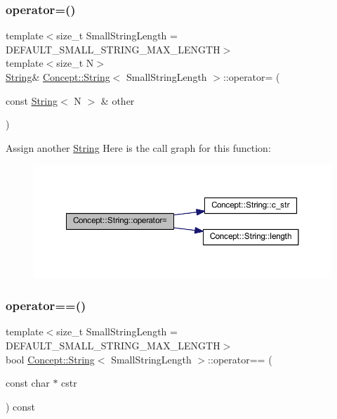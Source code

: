 \subsubsection{\texorpdfstring{operator=()}{operator=()}\hspace{0.1cm}{\footnotesize\ttfamily [3/3]}}
{\footnotesize\ttfamily template$<$size\+\_\+t Small\+String\+Length = D\+E\+F\+A\+U\+L\+T\+\_\+\+S\+M\+A\+L\+L\+\_\+\+S\+T\+R\+I\+N\+G\+\_\+\+M\+A\+X\+\_\+\+L\+E\+N\+G\+TH$>$ \\
template$<$size\+\_\+t N$>$ \\
\mbox{\hyperlink{class_concept_1_1_string}{String}}\& \mbox{\hyperlink{class_concept_1_1_string}{Concept\+::\+String}}$<$ Small\+String\+Length $>$\+::operator= (\begin{DoxyParamCaption}\item[{const \mbox{\hyperlink{class_concept_1_1_string}{String}}$<$ N $>$ \&}]{other }\end{DoxyParamCaption})\hspace{0.3cm}{\ttfamily [inline]}}

Assign another \mbox{\hyperlink{class_concept_1_1_string}{String}} Here is the call graph for this function\+:\nopagebreak
\begin{figure}[H]
\begin{center}
\leavevmode
\includegraphics[width=350pt]{class_concept_1_1_string_a42293f97a2fc075a85ec90b5e9850d31_cgraph}
\end{center}
\end{figure}
\mbox{\label{class_concept_1_1_string_a93eecf5bf6eeab17e773126bc83bc63a}} 
\subsubsection{\texorpdfstring{operator==()}{operator==()}\hspace{0.1cm}{\footnotesize\ttfamily [1/2]}}
{\footnotesize\ttfamily template$<$size\+\_\+t Small\+String\+Length = D\+E\+F\+A\+U\+L\+T\+\_\+\+S\+M\+A\+L\+L\+\_\+\+S\+T\+R\+I\+N\+G\+\_\+\+M\+A\+X\+\_\+\+L\+E\+N\+G\+TH$>$ \\
bool \mbox{\hyperlink{class_concept_1_1_string}{Concept\+::\+String}}$<$ Small\+String\+Length $>$\+::operator== (\begin{DoxyParamCaption}\item[{const char $\ast$}]{cstr }\end{DoxyParamCaption}) const\hspace{0.3cm}{\ttfamily [inline]}}

